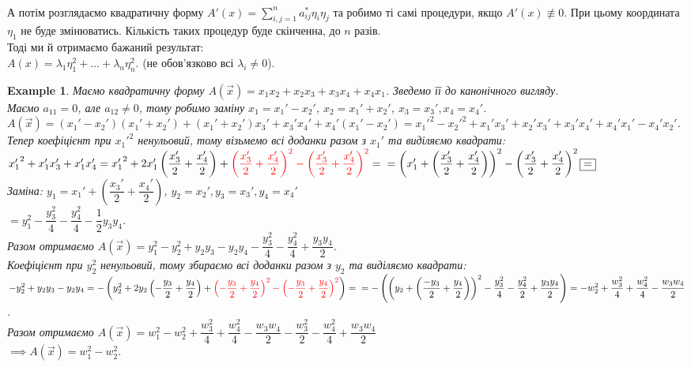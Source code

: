 \documentclass[a4paper, 10pt]{article}
\def\huge{\displaystyle}
\theoremstyle{theoremdd}
\theoremstyle{theoremdd}
\theoremstyle{theoremdd}
\theoremstyle{theoremdd}
\newtheorem{example}[theorem]{Example}
\theoremstyle{theoremdd}
\theoremstyle{theoremdd}
\theoremstyle{theoremdd}
\theoremstyle{theoremdd}
\begin{document}
\bigskip \\
А потім розглядаємо квадратичну форму $A'(x) = \huge\sum_{i,j=1}^n a_{ij}^* \eta_i \eta_j$ та робимо ті самі процедури, якщо $A'(x) \not\equiv 0$. При цьому координата $\eta_1$ не буде змінюватись. Кількість таких процедур буде скінченна, до $n$ разів.\\
Тоді ми й отримаємо бажаний результат:\\
$A(x) = \lambda_1 \eta_1^2 + \dots + \lambda_n \eta_n^2$. (не обов'язково всі $\lambda_i \neq 0$).

\begin{example}
Маємо квадратичну форму $A(\vec{x}) = x_1 x_2 + x_2 x_3 + x_3 x_4 + x_4 x_1$. Зведемо її до канонічного вигляду.\\
Маємо $a_{11} = 0$, але $a_{12} \neq 0$, тому робимо заміну $x_1 = x_1' - x_2'$, $x_2 = x_1' + x_2'$, $x_3 = x_3', x_4 = x_4'$.\\
$A(\vec{x}) = (x_1'-x_2')(x_1'+x_2') + (x_1'+x_2')x_3' + x_3' x_4' + x_4' (x_1' - x_2') = {x_1'}^2 - {x_2'}^2 + x_1'x_3' + x_2'x_3' + x_3' x_4' + x_4' x_1' - x_4' x_2'$.\\
Тепер коефіцієнт при ${x_1'}^2$ ненульовий, тому візьмемо всі доданки разом з $x_1'$ та виділяємо квадрати:\\
${x_1'}^2 + x_1'x_3' + x_1'x_4' = {x_1'}^2 + 2 x_1' \left( \dfrac{x_3'}{2} + \dfrac{x_4'}{2} \right) + \textcolor{red}{\left( \dfrac{x_3'}{2} + \dfrac{x_4'}{2} \right)^2 - \left(\dfrac{x_3'}{2} + \dfrac{x_4'}{2} \right)^2} = \\
= \left( x_1' + \left( \dfrac{x_3'}{2} + \dfrac{x_4'}{2} \right) \right)^2 - \left( \dfrac{x_3'}{2} + \dfrac{x_4'}{2} \right)^2 \boxed{=}$\\
Заміна: $y_1 = x_1' + \left( \dfrac{x_3'}{2} + \dfrac{x_4'}{2} \right)$, $y_2 = x_2', y_3 = x_3', y_4 = x_4'$\\
$\boxed{=} y_1^2  - \dfrac{y_3^2}{4} - \dfrac{y_4^2}{4} - \dfrac{1}{2}y_3y_4$.\\
Разом отримаємо $A(\vec{x}) = y_1^2 - y_2^2 + y_2y_3 - y_2y_4 - \dfrac{y_3^2}{4} - \dfrac{y_4^2}{4} + \dfrac{y_3y_4}{2}$.\\
Коефіцієнт при $y_2^2$ ненульовий, тому збираємо всі доданки разом з $y_2$ та виділяємо квадрати:\\
$-y_2^2 + y_2y_3 - y_2y_4 = -\left(y_2^2 +2y_2 \left( -\dfrac{y_3}{2} + \dfrac{y_4}{2} \right) + \textcolor{red}{\left( -\dfrac{y_3}{2} + \dfrac{y_4}{2} \right)^2 - \left( -\dfrac{y_3}{2} + \dfrac{y_4}{2} \right)^2} \right) = \\ 
= - \left( \left( y_2 + \left( \dfrac{-y_3}{2} + \dfrac{y_4}{2} \right) \right)^2 - \dfrac{y_3^2}{4} - \dfrac{y_4^2}{2} + \dfrac{y_3y_4}{2} \right) = -w_2^2 + \dfrac{w_3^2}{4} + \dfrac{w_4^2}{4} - \dfrac{w_3 w_4}{2}$.\\
Разом отримаємо $A(\vec{x}) = w_1^2 - w_2^2 + \dfrac{w_3^2}{4} + \dfrac{w_4^2}{4} - \dfrac{w_3w_4}{2} - \dfrac{w_3^2}{2} - \dfrac{w_4^2}{4} + \dfrac{w_3w_4}{2}$\\
$\implies A(\vec{x}) = w_1^2 - w_2^2$.
\end{example}
\end{document}
